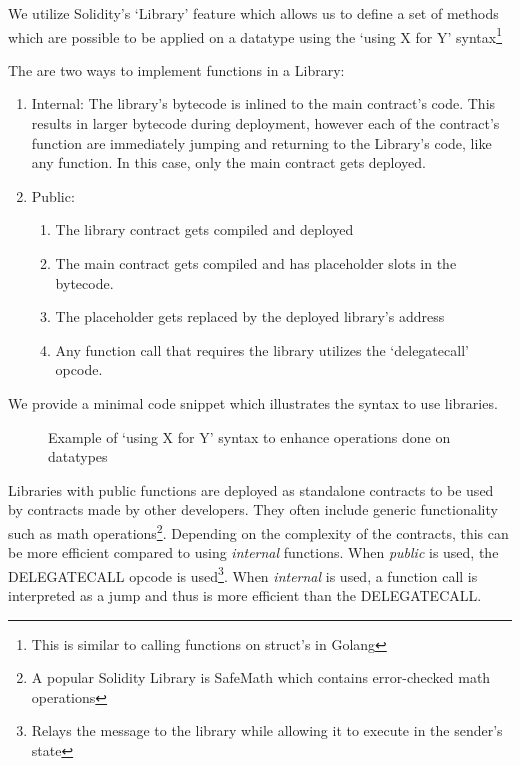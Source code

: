 We utilize Solidity's `Library' feature which allows us to define a set of methods which are possible to be applied on a datatype using the `using X for Y' syntax\footnote{This is similar to calling functions on struct's in Golang} 

The are two ways to implement functions in a Library:
\begin{enumerate}
    \item Internal: The library's bytecode is inlined to the main contract's code. This results in larger bytecode during deployment, however each of the contract's function are immediately jumping and returning to the Library's code, like any function. In this case, only the main contract gets deployed.
    \item Public: 
        \begin{enumerate}
            \item The library contract gets compiled and deployed
            \item The main contract gets compiled and has placeholder slots in the bytecode.
            \item The placeholder gets replaced by the deployed library's address
            \item Any function call that requires the library utilizes the `delegatecall' opcode.
        \end{enumerate}
\end{enumerate}

We provide a minimal code snippet which illustrates the syntax to use libraries. 

\begin{figure}[H]
    \centering
    
    \label{fig:library}
    \caption{Example of `using X for Y' syntax to enhance operations done on datatypes}
\end{figure}


Libraries with public functions are deployed as standalone contracts to be used by contracts made by other developers. They often include generic functionality such as math operations\footnote{A popular Solidity Library is SafeMath which contains error-checked math operations}. Depending on the complexity of the contracts, this can be more efficient compared to using \textit{internal} functions. When \textit{public} is used, the DELEGATECALL opcode is used\footnote{Relays the message to the library while allowing it to execute in the sender's state}. When \textit{internal} is used, a function call is interpreted as a jump and thus is more efficient than the DELEGATECALL. 

